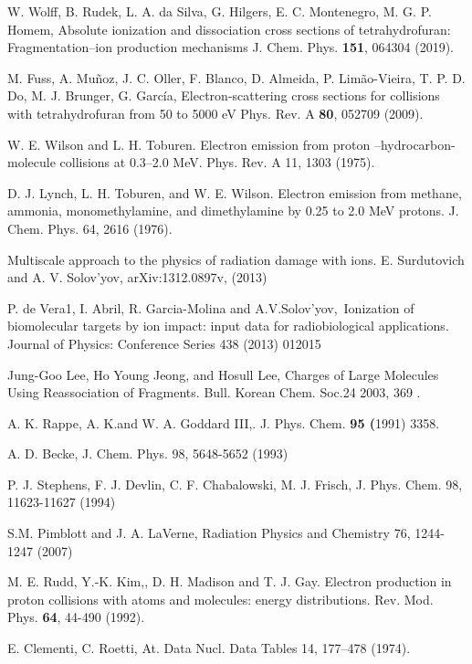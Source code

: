 \documentclass[preprint,12pt]{article}
\begin{document}
\begin{thebibliography}{99}
W. Wolff, B. Rudek, L. A. da Silva, G. Hilgers, E. C. Montenegro, 
M. G. P. Homem,
Absolute ionization and dissociation cross sections of tetrahydrofuran:
Fragmentation--ion production mechanisms
J. Chem. Phys. \textbf{151}, 064304 (2019).

M. Fuss, A. Muñoz, J. C. Oller, F. Blanco, D. Almeida, P. Limão-Vieira, 
T. P. D. Do, M. J. Brunger, G. García,
Electron-scattering cross sections for collisions with tetrahydrofuran 
from 50 to 5000 eV
Phys. Rev. A \textbf{80}, 052709 (2009).


W. E. Wilson and L. H. Toburen. Electron emission from
proton --hydrocarbon-molecule collisions at 0.3--2.0 MeV. 
Phys. Rev. A 11, 1303 (1975).

D. J. Lynch, L. H. Toburen, and W. E. Wilson. Electron
emission from methane, ammonia, monomethylamine, and dimethylamine by 0.25
to 2.0 MeV protons. 
J. Chem. Phys. 64, 2616 (1976).

Multiscale approach to the physics of radiation
damage with ions. E. Surdutovich and A. V. Solov'yov, 
arXiv:1312.0897v, (2013)

P. de Vera1, I. Abril, R. Garcia-Molina and
A.V.Solov'yov,\ Ionization of biomolecular targets by ion impact: input data
for radiobiological applications. 
Journal of Physics: Conference Series 438
(2013) 012015

Jung-Goo Lee, Ho Young Jeong, and Hosull Lee, Charges of
Large Molecules Using Reassociation of Fragments. 
Bull. Korean Chem. Soc.24 2003, 369 .

A. K. Rappe, A. K.and W. A. Goddard III,. 
J. Phys. Chem. \textbf{95 (}1991) 3358.

A. D. Becke, 
J. Chem. Phys. 98, 5648-5652 (1993) 

P. J. Stephens, F. J. Devlin, C. F. Chabalowski, M. J. Frisch,
J. Phys. Chem. 98, 11623-11627 (1994) 

S.M. Pimblott and J. A. LaVerne, Radiation
Physics and Chemistry 76, 1244-1247 (2007)

M. E. Rudd, Y.-K. Kim,, D. H. Madison and T. J. Gay.
Electron production in proton collisions with atoms and molecules: energy
distributions. 
Rev. Mod. Phys. \textbf{64}, 44-490 (1992).

E. Clementi, C. Roetti,
At. Data Nucl. Data Tables 14, 177--478 (1974).


\end{thebibliography}
\end{document}
